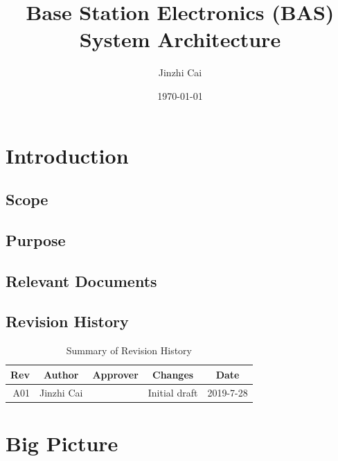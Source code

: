 \documentclass[12pt,article]{memoir}
\title{Base Station Electronics (BAS) System Architecture}
\author{Jinzhi Cai}
\date{\today}
\begin{document}
	


\tableofcontents*
\clearpage


\chapter{Introduction}
\section{Scope}

\section{Purpose}

\section{Relevant Documents}

\section{Revision History}
\begin{table}[H]
	\centering
	\begin{tabu}{r || c | c | c | c }
		Rev & Author & Approver & Changes & Date\\ \hline
		A01 & Jinzhi Cai & & Initial draft & 2019-7-28\\
	\end{tabu}
	\caption{Summary of Revision History}
	\label{tab:rev}
\end{table}
\newpage
\chapter{Big Picture}
\newpage
\end{document}
